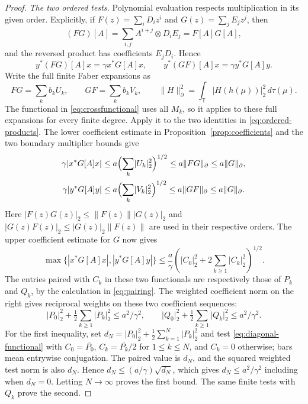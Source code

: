 \documentclass[11pt]{article}
\newcommand{\T}{\mathbb T}
\newcommand{\HS}[1]{\lvert #1\rvert_2}
\theoremstyle{remark}\newtheorem{remark}[theorem]{Remark}
\numberwithin{equation}{section}
\begin{document}
\begin{proof}
\emph{The two ordered tests.}
Polynomial evaluation respects multiplication in its given order. Explicitly, if $F(z)=\sum_iD_iz^i$ and $G(z)=\sum_jE_jz^j$, then
\[
 (FG)[A]=\sum_{i,j}A^{i+j}\otimes D_iE_j=F[A]G[A],
\]
and the reversed product has coefficients $E_jD_i$. Hence
\begin{equation}\label{eq:ordered-products}
 y^*(FG)[A]x=\gamma x^*G[A]x,\qquad
 y^*(GF)[A]x=\gamma y^*G[A]y.
\end{equation}
Write the full finite Faber expansions as
\[
 FG=\sum_k b_kU_k,\qquad GF=\sum_k b_kV_k,
 \qquad \|H\|_\partial^2=\int_\T\HS{H(h(\mu))}^2\,d\tau(\mu).
\]
The functional in \eqref{eq:crossfunctional} uses all $M_k$, so it applies
to these full expansions for every finite degree. Apply it to the two
identities in \eqref{eq:ordered-products}. The lower coefficient estimate
in Proposition~\ref{prop:coefficients} and the two boundary multiplier
bounds give
\begin{align*}
 \gamma|x^*G[A]x|
 &\le a\Bigl(\sum_k\HS{U_k}^2\Bigr)^{1/2}
 \le a\|FG\|_\partial\le a\|G\|_\partial,\\
 \gamma|y^*G[A]y|
 &\le a\Bigl(\sum_k\HS{V_k}^2\Bigr)^{1/2}
 \le a\|GF\|_\partial\le a\|G\|_\partial.
\end{align*}
Here $\HS{F(z)G(z)}\le\|F(z)\|\HS{G(z)}$ and
$\HS{G(z)F(z)}\le\HS{G(z)}\|F(z)\|$ are used in their
respective orders. The upper coefficient estimate for $G$ now gives
\begin{equation}\label{eq:diagonal-functional}
 \max\{|x^*G[A]x|,|y^*G[A]y|\}
 \le\frac a\gamma
 \left(\HS{C_0}^2+2\sum_{k\ge1}\HS{C_k}^2\right)^{1/2}.
\end{equation}
The entries paired with $C_k$ in these two functionals are respectively those of $P_k$ and $Q_k$, by the calculation in \eqref{eq:pairing}. The weighted coefficient norm on the right gives reciprocal weights on these two coefficient sequences:
\begin{equation}\label{eq:weighted-dual}
 \HS{P_0}^2+\tfrac12\sum_{k\ge1}\HS{P_k}^2\le a^2/\gamma^2,
 \qquad
 \HS{Q_0}^2+\tfrac12\sum_{k\ge1}\HS{Q_k}^2\le a^2/\gamma^2.
\end{equation}
For the first inequality, set
$d_N=\HS{P_0}^2+\tfrac12\sum_{k=1}^N\HS{P_k}^2$
and test \eqref{eq:diagonal-functional} with $C_0=\overline{P_0}$,
$C_k=\overline{P_k}/2$ for $1\le k\le N$, and $C_k=0$ otherwise;
bars mean entrywise conjugation. The paired value is $d_N$, and the squared
weighted test norm is also $d_N$. Hence
$d_N\le(a/\gamma)\sqrt{d_N}$, which gives $d_N\le a^2/\gamma^2$
including when $d_N=0$. Letting $N\to\infty$ proves the first bound.
The same finite tests with $Q_k$ prove the second.


\end{proof}
\end{document}
